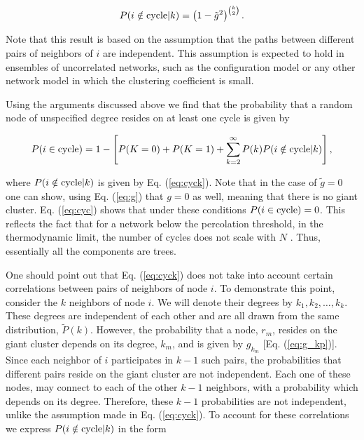 \documentclass[preprint,pre,superscriptaddress,showpacs]{revtex4}
\begin{document}
\begin{equation}
P(i \notin {\rm cycle} |k) = \left( 1 - {\tilde g}^2 \right)^{\binom{k}{2}}.
\label{eq:cyck}
\end{equation}

\noindent
Note that this result is based on the assumption that the paths 
between different pairs of neighbors of $i$ are independent.
This assumption is expected to hold in ensembles of uncorrelated networks,
such as the configuration model or any other network model in which
the clustering coefficient is small.

Using the arguments discussed above
we find that
the probability that a random node of unspecified degree
resides on at least one cycle is given by

\begin{equation}
P(i \in {\rm cycle})
=
1
- \left[P(K=0)+P(K=1)
+\sum_{k=2}^{\infty} P(k)
P(i \notin {\rm cycle} | k)
\right],
\label{eq:cyc}
\end{equation}

\noindent
where $P(i \notin {\rm cycle} | k)$
is given by Eq. (\ref{eq:cyck}).
Note that in the case of $\tilde g=0$ one can show,
using Eq. (\ref{eq:g}) that $g=0$ as well, meaning
that there is no giant cluster.
Eq. (\ref{eq:cyc}) shows that under these conditions
$P(i \in {\rm cycle})=0$.
This reflects the fact that for a network below the percolation threshold,
in the thermodynamic limit, the number of cycles does not scale with
$N$ \cite{Takacs1988,Bollobas2001}.
Thus, essentially all the components are trees.


One should point out that Eq. (\ref{eq:cyck}) does not take into account
certain correlations between pairs of neighbors of node $i$.
To demonstrate this point,
consider the $k$ neighbors of node $i$. We will denote their degrees by
$k_1,k_2,\dots,k_k$. These degrees are independent of each other and
are all drawn from the same distribution, $\widetilde P(k)$.
However, the probability that a node, $r_m$, resides on the giant
cluster depends on its degree, $k_m$,
and is given by $g_{k_m}$
[Eq. (\ref{eq:g_kp})].
Since each neighbor of $i$ participates in $k-1$ such pairs, the
probabilities that different pairs reside on the giant cluster are
not independent.
Each one of these nodes,  may connect to each of the other $k-1$
neighbors, with a probability which depends on its degree. 
Therefore, these $k-1$ probabilities are not independent, unlike
the assumption made in Eq. (\ref{eq:cyck}).
To account for these correlations we  express $P(i \notin {\rm cycle} |k)$
in the form
\end{document}
